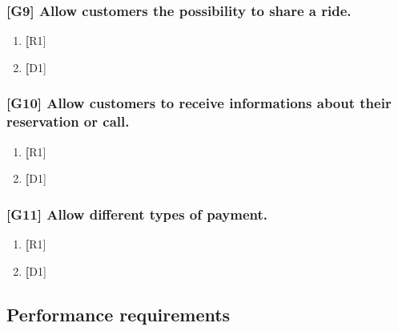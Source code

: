 \subsubsection{[G9] Allow customers the possibility to share a ride.}
	\begin{enumerate}
	\item \textbf [R1]
	\item \textbf [D1] 
	\end{enumerate}

\subsubsection{[G10] Allow customers to receive informations about their reservation or call.}
	\begin{enumerate}
	\item \textbf [R1]
	\item \textbf [D1] 
	\end{enumerate}

\subsubsection{[G11] Allow different types of payment.}
	\begin{enumerate}
	\item \textbf [R1]
	\item \textbf [D1] 
	\end{enumerate}	

%
\subsection{Performance requirements}
